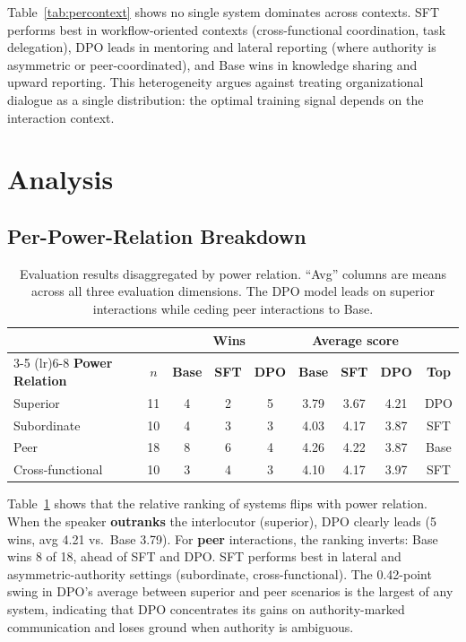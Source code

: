 \documentclass{article}
\begin{document}
Table~\ref{tab:percontext} shows no single system dominates across contexts. SFT performs best in workflow-oriented contexts (cross-functional coordination, task delegation), DPO leads in mentoring and lateral reporting (where authority is asymmetric or peer-coordinated), and Base wins in knowledge sharing and upward reporting. This heterogeneity argues against treating organizational dialogue as a single distribution: the optimal training signal depends on the interaction context.


\section{Analysis}
\label{sec:analysis}

\subsection{Per-Power-Relation Breakdown}

\begin{table}[t]
\caption{Evaluation results disaggregated by power relation. ``Avg'' columns are means across all three evaluation dimensions. The DPO model leads on superior interactions while ceding peer interactions to Base.}
\label{tab:power}
\begin{center}
\small
\begin{tabular}{lcccccccc}
\toprule
& & \multicolumn{3}{c}{\textbf{Wins}} & \multicolumn{3}{c}{\textbf{Average score}} & \\
\cmidrule(lr){3-5} \cmidrule(lr){6-8}
\textbf{Power Relation} & $n$ & \textbf{Base} & \textbf{SFT} & \textbf{DPO} & \textbf{Base} & \textbf{SFT} & \textbf{DPO} & \textbf{Top} \\
\midrule
Superior & 11 & 4 & 2 & 5 & 3.79 & 3.67 & 4.21 & DPO \\
Subordinate & 10 & 4 & 3 & 3 & 4.03 & 4.17 & 3.87 & SFT \\
Peer & 18 & 8 & 6 & 4 & 4.26 & 4.22 & 3.87 & Base \\
Cross-functional & 10 & 3 & 4 & 3 & 4.10 & 4.17 & 3.97 & SFT \\
\bottomrule
\end{tabular}
\end{center}
\end{table}

Table~\ref{tab:power} shows that the relative ranking of systems flips with power relation. When the speaker \textbf{outranks} the interlocutor (superior), DPO clearly leads (5 wins, avg 4.21 vs.\ Base 3.79). For \textbf{peer} interactions, the ranking inverts: Base wins 8 of 18, ahead of SFT and DPO. SFT performs best in lateral and asymmetric-authority settings (subordinate, cross-functional). The 0.42-point swing in DPO's average between superior and peer scenarios is the largest of any system, indicating that DPO concentrates its gains on authority-marked communication and loses ground when authority is ambiguous.
\end{document}

